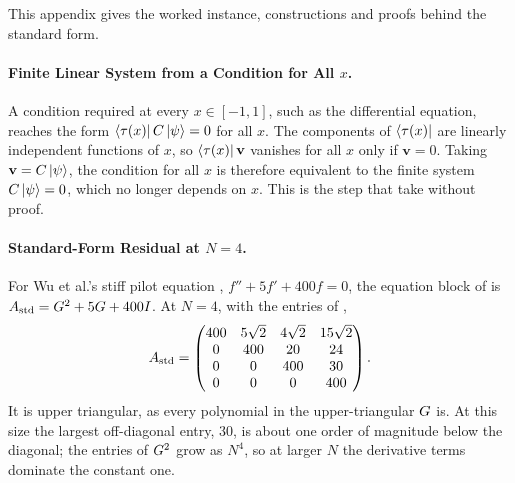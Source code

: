 This appendix gives the worked instance, constructions and proofs behind the standard form.

\paragraph{Finite Linear System from a Condition for All $x$.} \label{app:pihm-constraint-proof}A condition required at every $x\in[-1,1]$, such as the differential equation, reaches the form $\bra{\tau(x)}C\ket{\psi}=0$ for all $x$. The components of $\bra{\tau(x)}$ are linearly independent functions of $x$, so $\bra{\tau(x)}\mathbf{v}$ vanishes for all $x$ only if $\mathbf{v}=0$. Taking $\mathbf{v}=C\ket{\psi}$, the condition for all $x$ is therefore equivalent to the finite system $C\ket{\psi}=0$, which no longer depends on $x$. This is the step that  take without proof.

\paragraph{Standard-Form Residual at $N=4$.} For Wu et al.'s stiff pilot equation \cite{wu2025pihm}, $f'' + 5f' + 400f = 0$, the equation block of  is $A_{\mathrm{std}} = G^{2} + 5G + 400I$. At $N=4$, with the entries of ,
\begin{equation}
    A_{\mathrm{std}} =
    \begin{pmatrix}
        400 & 5\sqrt{2} & 4\sqrt{2} & 15\sqrt{2} \\
        0 & 400 & 20 & 24 \\
        0 & 0 & 400 & 30 \\
        0 & 0 & 0 & 400
    \end{pmatrix}.
    \label{eq:app-standard-example}
\end{equation}
It is upper triangular, as every polynomial in the upper-triangular $G$ is. At this size the largest off-diagonal entry, $30$, is about one order of magnitude below the diagonal; the entries of $G^2$ grow as $N^4$, so at larger $N$ the derivative terms dominate the constant one.

